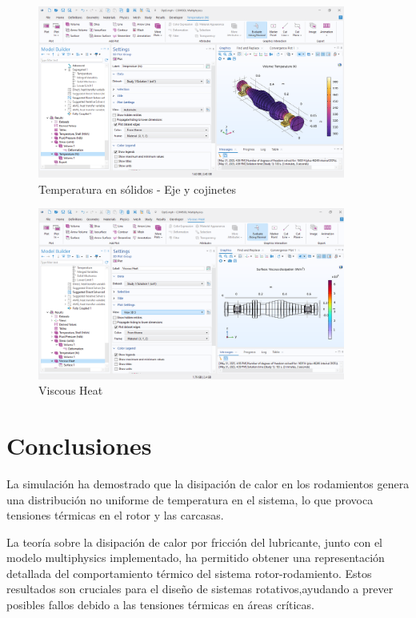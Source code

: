 \documentclass{article}
\theoremstyle{mytheoremstyle}
\theoremstyle{mytheoremstyle}
\theoremstyle{myproblemstyle}
\begin{document}
            \begin{figure}[H]
              \centering
              \includegraphics[width=0.9\textwidth]{temp_solidos.png}
              \caption{Temperatura en sólidos - Eje y cojinetes}
              \label{fig:comsol_temp_solidos_eje_cojinetes} %
            \end{figure}

             \begin{figure}[H]
              \centering
              \includegraphics[width=0.9\textwidth]{visheat.png}
              \caption{Viscous Heat}
              \label{fig:comsol_viscous_heat} %
            \end{figure}

            
          \section{Conclusiones}
La simulación ha demostrado que la disipación de calor en los rodamientos genera una distribución no uniforme de temperatura en el sistema, lo que provoca tensiones térmicas en el rotor y las carcasas.

La teoría sobre la disipación de calor por fricción del lubricante, junto con el modelo multiphysics implementado, ha permitido obtener una representación detallada del comportamiento térmico del sistema rotor-rodamiento. Estos resultados son cruciales para el diseño de sistemas rotativos,ayudando a prever posibles fallos debido a las tensiones térmicas en áreas críticas.

\nocite{*}

\end{document}
